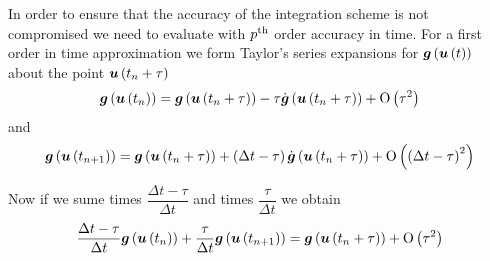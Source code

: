 In order to ensure that the accuracy of the integration scheme is not
compromised we need to evaluate  with
${p}^{\text{th}}$ order accuracy in time. For a first order in time approximation we form Taylor's series expansions for
$ \boldsymbol{g}\left(  \boldsymbol{u}\left( t \right)  \right) $ about the point
$ \boldsymbol{u}\left( t_{n}+\tau \right) $ \ie
\begin{equation}
  \fnof{\vectr{g}}{\fnof{\vectr{u}}{t_{n}}}=\fnof{\vectr{g}}{\fnof{\vectr{u}}{t_{n}+\tau}}-
  \tau\fnof{\dot{\vectr{g}}}{\fnof{\vectr{u}}{t_{n}+\tau}}+\orderof{\tau^{2}}
  \label{eqn:firstordercurrentTaylorexpansion}
\end{equation}
and
\begin{equation}
  \fnof{\vectr{g}}{\fnof{\vectr{u}}{t_{n+1}}}=\fnof{\vectr{g}}{\fnof{\vectr{u}}{t_{n}+\tau}}+
  \pbrac{\Delta
    t-\tau}\fnof{\dot{\vectr{g}}}{\fnof{\vectr{u}}{t_{n}+\tau}}+\orderof{\pbrac{\Delta
      t-\tau}^{2}}
  \label{eqn:firstordernextTaylorexpansion}
\end{equation}

Now if we sume  times
$\dfrac{\Delta t -\tau}{\Delta t}$ and
 times 
$\dfrac{\tau}{\Delta t}$ we obtain
\begin{equation}
  \dfrac{\Delta t-\tau}{\Delta t} \boldsymbol{g}\left(  \boldsymbol{u}\left( t_{n} \right)  \right) +
  \dfrac{\tau}{\Delta t} \boldsymbol{g}\left(  \boldsymbol{u}\left( t_{n+1} \right)  \right) =
   \boldsymbol{g}\left(  \boldsymbol{u}\left( t_{n}+\tau \right)  \right) + \mathrm{O}\left( \tau^{2} \right) 
\end{equation}

